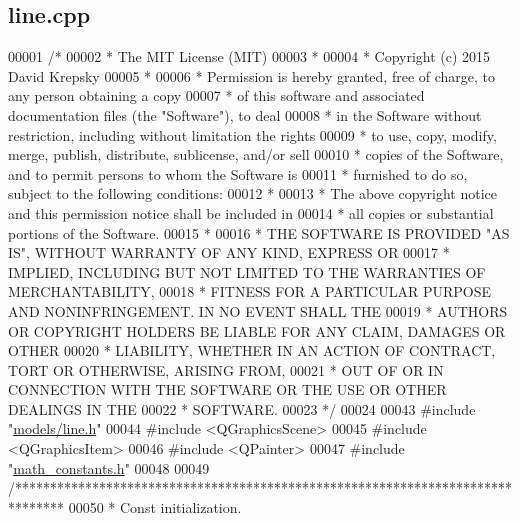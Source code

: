 \hypertarget{line_8cpp_source}{}\subsection{line.\+cpp}
\label{line_8cpp_source}

\begin{DoxyCode}
00001 \textcolor{comment}{/*}
00002 \textcolor{comment}{ * The MIT License (MIT)}
00003 \textcolor{comment}{ *}
00004 \textcolor{comment}{ * Copyright (c) 2015 David Krepsky}
00005 \textcolor{comment}{ *}
00006 \textcolor{comment}{ * Permission is hereby granted, free of charge, to any person obtaining a copy}
00007 \textcolor{comment}{ * of this software and associated documentation files (the "Software"), to deal}
00008 \textcolor{comment}{ * in the Software without restriction, including without limitation the rights}
00009 \textcolor{comment}{ * to use, copy, modify, merge, publish, distribute, sublicense, and/or sell}
00010 \textcolor{comment}{ * copies of the Software, and to permit persons to whom the Software is}
00011 \textcolor{comment}{ * furnished to do so, subject to the following conditions:}
00012 \textcolor{comment}{ *}
00013 \textcolor{comment}{ * The above copyright notice and this permission notice shall be included in}
00014 \textcolor{comment}{ * all copies or substantial portions of the Software.}
00015 \textcolor{comment}{ *}
00016 \textcolor{comment}{ * THE SOFTWARE IS PROVIDED "AS IS", WITHOUT WARRANTY OF ANY KIND, EXPRESS OR}
00017 \textcolor{comment}{ * IMPLIED, INCLUDING BUT NOT LIMITED TO THE WARRANTIES OF MERCHANTABILITY,}
00018 \textcolor{comment}{ * FITNESS FOR A PARTICULAR PURPOSE AND NONINFRINGEMENT. IN NO EVENT SHALL THE}
00019 \textcolor{comment}{ * AUTHORS OR COPYRIGHT HOLDERS BE LIABLE FOR ANY CLAIM, DAMAGES OR OTHER}
00020 \textcolor{comment}{ * LIABILITY, WHETHER IN AN ACTION OF CONTRACT, TORT OR OTHERWISE, ARISING FROM,}
00021 \textcolor{comment}{ * OUT OF OR IN CONNECTION WITH THE SOFTWARE OR THE USE OR OTHER DEALINGS IN THE}
00022 \textcolor{comment}{ * SOFTWARE.}
00023 \textcolor{comment}{ */}
00024 
00043 \textcolor{preprocessor}{#include "\hyperlink{line_8h}{models/line.h}"}
00044 \textcolor{preprocessor}{#include <QGraphicsScene>}
00045 \textcolor{preprocessor}{#include <QGraphicsItem>}
00046 \textcolor{preprocessor}{#include <QPainter>}
00047 \textcolor{preprocessor}{#include "\hyperlink{math__constants_8h}{math\_constants.h}"}
00048 
00049 \textcolor{comment}{/*******************************************************************************}
00050 \textcolor{comment}{ * Const initialization.}

\end{DoxyCode}
